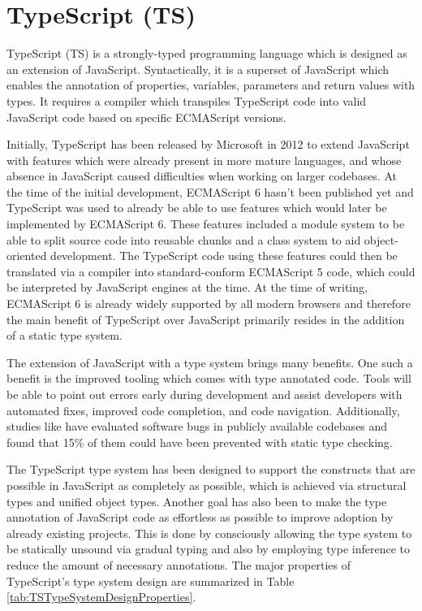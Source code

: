 \section{TypeScript (TS)}
\label{sec:TS}

TypeScript (TS) is a strongly-typed programming language which is designed as an extension of JavaScript. 
Syntactically, it is a superset of JavaScript which enables the annotation of properties, variables, parameters and return values with types. 
It requires a compiler which transpiles TypeScript code into valid JavaScript code based on specific ECMAScript versions.

Initially, TypeScript has been released by Microsoft in 2012 \parencite{TSFirstRelease} to extend JavaScript with features which were already present in more mature languages, and whose absence in JavaScript caused difficulties when working on larger codebases. 
At the time of the initial development, ECMAScript 6 hasn't been published yet and TypeScript was used to already be able to use features which would later be implemented by ECMAScript 6.
These features included a module system to be able to split source code into reusable chunks and a class system to aid object-oriented development. 
The TypeScript code using these features could then be translated via a compiler into standard-conform ECMAScript 5 code, which could be interpreted by JavaScript engines at the time. 
At the time of writing, ECMAScript 6 is already widely supported by all modern browsers and therefore the main benefit of TypeScript over JavaScript primarily resides in the addition of a static type system.

The extension of JavaScript with a type system brings many benefits. 
One such a benefit is the improved tooling which comes with type annotated code. 
Tools will be able to point out errors early during development and assist developers with automated fixes, improved code completion, and code navigation. 
Additionally, studies like \cite{ToTypeOrNotToType} have evaluated software bugs in publicly available codebases and found that 15\% of them could have been prevented with static type checking.

The TypeScript type system has been designed to support the constructs that are possible in JavaScript as completely as possible, which is achieved via structural types and unified object types. 
Another goal has also been to make the type annotation of JavaScript code as effortless as possible to improve adoption by already existing projects. 
This is done by consciously allowing the type system to be statically unsound via gradual typing and also by employing type inference to reduce the amount of necessary annotations. 
The major properties of TypeScript's type system design are summarized in Table \ref{tab:TSTypeSystemDesignProperties}.

